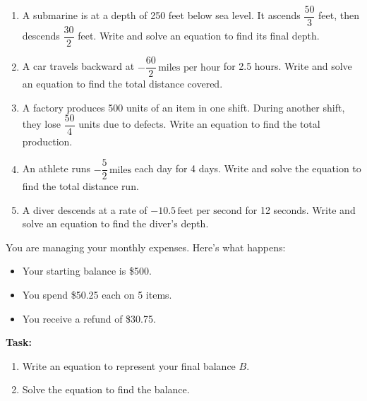 \documentclass[12pt]{article}
\begin{document}
\begin{tcolorbox}[colframe=black!60, colback=white, 
coltitle=black, colbacktitle=black!15, fonttitle=\bfseries\Large, 
title=Problems, halign title=center, left=10pt, right=10pt, top=10pt, bottom=60pt]
\begin{enumerate}[start=9, itemsep=5em]
    \item A submarine is at a depth of 250 feet below sea level. It ascends \( \dfrac{50}{3} \) feet, then descends \( \dfrac{30}{2} \) feet. Write and solve an equation to find its final depth.
    \item A car travels backward at \( -\dfrac{60}{2} \, \text{miles per hour} \) for 2.5 hours. Write and solve an equation to find the total distance covered.
    \item A factory produces 500 units of an item in one shift. During another shift, they lose \( \dfrac{50}{4} \) units due to defects. Write an equation to find the total production.
    \item An athlete runs \( -\dfrac{5}{2} \, \text{miles} \) each day for 4 days. Write and solve the equation to find the total distance run.
    \item A diver descends at a rate of \( -10.5 \, \text{feet per second} \) for 12 seconds. Write and solve an equation to find the diver's depth.
\end{enumerate}
\end{tcolorbox}

\vspace{1em}

\begin{tcolorbox}[colframe=black!60, colback=white, 
coltitle=black, colbacktitle=black!15, fonttitle=\bfseries\Large, 
title=Performance Task: Financial Planning with Rational Numbers, halign title=center, left=10pt, right=10pt, top=10pt, bottom=90pt]
You are managing your monthly expenses. Here’s what happens:
\begin{itemize}
    \item Your starting balance is \$500.
    \item You spend \$50.25 each on 5 items.
    \item You receive a refund of \$30.75.
\end{itemize}
\textbf{Task:}
\begin{enumerate}[itemsep=5em]
    \item Write an equation to represent your final balance \(B\).
    \item Solve the equation to find the balance.
 
\end{enumerate}
\end{tcolorbox}
\end{document}
